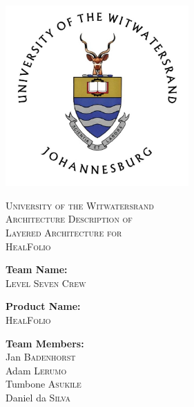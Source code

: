 \documentclass[10pt,oneside]{report}
\begin{document}
\begin{titlepage}

\centering

\includegraphics[width=7cm]{Wits-logo1.jpg}

\vskip 0.1cm

\center 

\textsc{\LARGE University of the Witwatersrand}\\[0.4cm] 

\textsc{\Large Architecture Description of \\ 
    Layered Architecture for \\[0.1cm] 
    HealFolio} \\[0.4cm] 

\begin{minipage}{0.4\textwidth}

\begin{center} \large

\textbf{Team Name:} \\[0.2cm]

\textsc{Level Seven Crew} \\[0.2cm]

\end{center}

\begin{center} \large

\textbf{Product Name:} \\[0.2cm]

\textsc{HealFolio} \\[0.7cm]

\end{center}

\begin{flushleft} \large

\textbf{Team Members:} \\[0.2cm]

Jan \textsc{Badenhorst} \\
Adam \textsc{Lerumo} \\
Tumbone \textsc{Asukile} \\
Daniel da \textsc{Silva} \\


\end{flushleft}
\end{minipage}
\end{titlepage}
\end{document}
